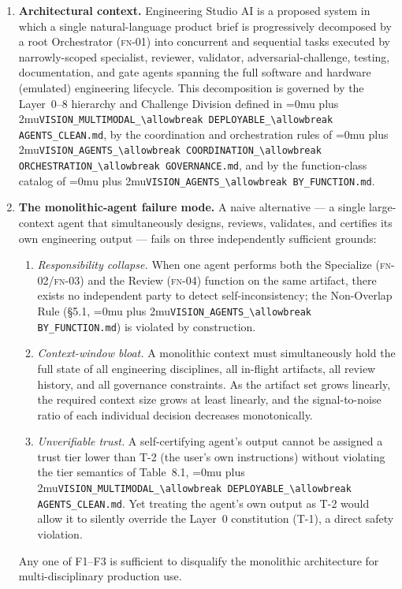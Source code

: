 \documentclass[12pt]{article}
\theoremstyle{definition}
\DeclareRobustCommand{\code}[1]{\begingroup\Urlmuskip=0mu plus 2mu\relax\nolinkurl{#1}\endgroup}
\newcommand{\FN}[1]{\textsc{fn-#1}}
\newcommand{\VisionClean}{\code{VISION\_MULTIMODAL\_\allowbreak DEPLOYABLE\_\allowbreak AGENTS\_CLEAN.md}}
\newcommand{\VisionGov}{\code{VISION\_AGENTS\_\allowbreak COORDINATION\_\allowbreak ORCHESTRATION\_\allowbreak GOVERNANCE.md}}
\newcommand{\VisionFunc}{\code{VISION\_AGENTS\_\allowbreak BY\_FUNCTION.md}}
\begin{document}
\begin{enumerate}

    \item \textbf{Architectural context.}
          Engineering Studio AI is a proposed system in which a single
          natural-language product brief is progressively decomposed by a
          root Orchestrator (\FN{01}) into concurrent and sequential tasks
          executed by narrowly-scoped specialist, reviewer, validator,
          adversarial-challenge, testing, documentation, and gate agents
          spanning the full software and hardware (emulated) engineering
          lifecycle.
          This decomposition is governed by the Layer~0--8 hierarchy and
          Challenge Division defined in \VisionClean{}, by the
          coordination and orchestration rules of \VisionGov{}, and by the
          function-class catalog of \VisionFunc{}.

    \item \textbf{The monolithic-agent failure mode.}
          A naive alternative --- a single large-context agent that
          simultaneously designs, reviews, validates, and certifies its own
          engineering output --- fails on three independently sufficient
          grounds:
          \begin{enumerate}
              \item[F1.] \emph{Responsibility collapse.}
                         When one agent performs both the Specialize
                         (\FN{02}/\FN{03}) and the Review (\FN{04}) function
                         on the same artifact, there exists no independent
                         party to detect self-inconsistency; the
                         Non-Overlap Rule (\S5.1, \VisionFunc{}) is
                         violated by construction.

              \item[F2.] \emph{Context-window bloat.}
                         A monolithic context must simultaneously hold the
                         full state of all engineering disciplines, all
                         in-flight artifacts, all review history, and all
                         governance constraints.
                         As the artifact set grows linearly, the required
                         context size grows at least linearly, and the
                         signal-to-noise ratio of each individual
                         decision decreases monotonically.

              \item[F3.] \emph{Unverifiable trust.}
                         A self-certifying agent's output cannot be
                         assigned a trust tier lower than T-2 (the user's
                         own instructions) without violating the tier
                         semantics of Table~8.1, \VisionClean{}.
                         Yet treating the agent's own output as T-2 would
                         allow it to silently override the Layer~0
                         constitution (T-1), a direct safety violation.
          \end{enumerate}
          Any one of F1--F3 is sufficient to disqualify the monolithic
          architecture for multi-disciplinary production use.


\end{enumerate}
\end{document}
